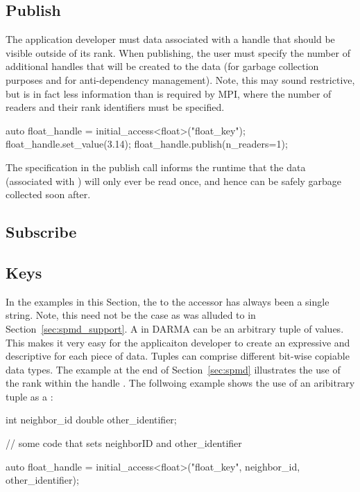 \subsection{Publish}
\label{subsec:publish}
The application developer must data associated with a
handle that should be visible
outside of its \gls{rank}.  When publishing,  the user must specify the
number of additional handles that will be created to the data (for garbage
collection purposes and for \gls{anti-dependency} management).
Note, this may sound restrictive, but is in fact
less information than is required by \gls{MPI}, where the number of readers and
their \gls{rank} identifiers must be specified.

\begin{CppCode}
auto float_handle = initial_access<float>("float_key");
float_handle.set_value(3.14);
float_handle.publish(n_readers=1);
\end{CppCode}
The  specification in the publish call informs the
runtime that the data (associated with ) will
only ever be read once, and hence can be safely garbage collected soon after.


\subsection{Subscribe}
\label{subsec:subscribe}

\subsection{Keys}
\label{subsec:keys}
In the examples in this Section, the  to the accessor has always been a
single string.  Note, this need not be the case as was alluded to in
Section~\ref{sec:spmd_support}. A
 in DARMA 
can be an arbitrary \gls{tuple} of values.  This 
makes it very easy for the applicaiton developer to create an expressive
and descriptive  for each piece of data.  Tuples can comprise
different bit-wise copiable data types.  The example at the end of
Section~\ref{sec:spmd} illustrates the use of the \gls{rank} within the handle
.  The follwoing example shows the use of an
aribitrary \gls{tuple} as a :
\begin{CppCode}
  int neighbor_id
  double other_identifier;

  // some code that sets neighborID and other_identifier
  
  auto float_handle = initial_access<float>("float_key", 
                                            neighbor_id, 
                                            other_identifier);
\end{CppCode}


